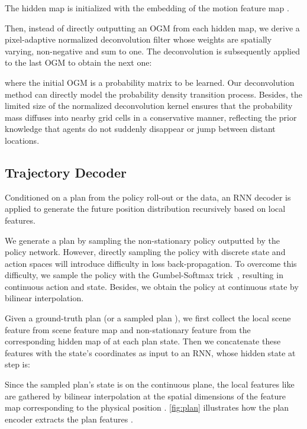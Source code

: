 \documentclass[10pt,twocolumn,letterpaper]{article}
\begin{document}
The hidden map is initialized with the embedding of the motion feature map .

Then, instead of directly outputting an OGM from each hidden map, we derive a pixel-adaptive normalized deconvolution filter whose weights are spatially varying, non-negative and sum to one. The deconvolution is subsequently applied to the last OGM to obtain the next one:

where the initial OGM  is a probability matrix to be learned. Our deconvolution method can directly model the probability density transition process. Besides, the limited size of the normalized deconvolution kernel ensures that the probability mass diffuses into nearby grid cells in a conservative manner, reflecting the prior knowledge that agents do not suddenly disappear or jump between distant locations.



\subsection{Trajectory Decoder}

Conditioned on a plan from the policy roll-out or the data, an RNN decoder is applied to generate the future position distribution recursively based on local features.


 We generate a plan  by sampling the non-stationary policy outputted by the policy network. However, directly sampling the policy with discrete state and action spaces will introduce difficulty in loss back-propagation. To overcome this difficulty, we sample the policy with the Gumbel-Softmax trick~\cite{jang2017categorical}, resulting in continuous action and state. Besides, we obtain the policy at continuous state  by bilinear interpolation.



 Given a ground-truth plan  (or a sampled plan ), we first collect the local scene feature from scene feature map  and non-stationary feature from the corresponding hidden map of  at each plan state. Then we concatenate these features with the state's coordinates as input to an RNN, whose hidden state at step  is:

Since the sampled plan's state  is on the continuous plane, the local features like  are gathered by bilinear interpolation at the spatial dimensions of the feature map  corresponding to the physical position . \cref{fig:plan} illustrates how the plan encoder extracts the plan features .
\end{document}
